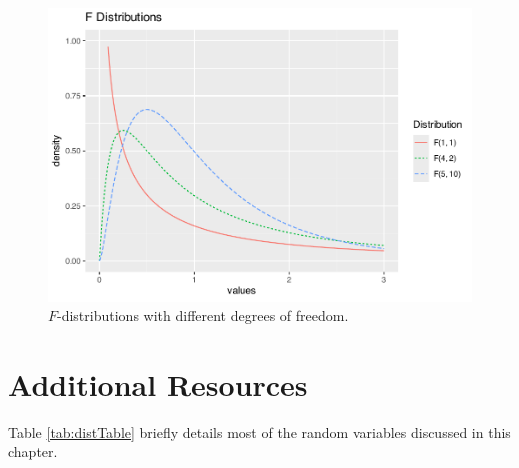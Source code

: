 \documentclass[
]{krantz}
\begin{document}
\begin{figure}

{\centering \includegraphics[width=0.6\linewidth]{bookdown-BeyondMLR_files/figure-latex/multF-1} 

}

\caption{\(F\)-distributions with different degrees of freedom.}\label{fig:multF}
\end{figure}

\section{Additional Resources}\label{additional-resources}

Table \ref{tab:distTable} briefly details most of the random variables discussed in this chapter.
\end{document}
